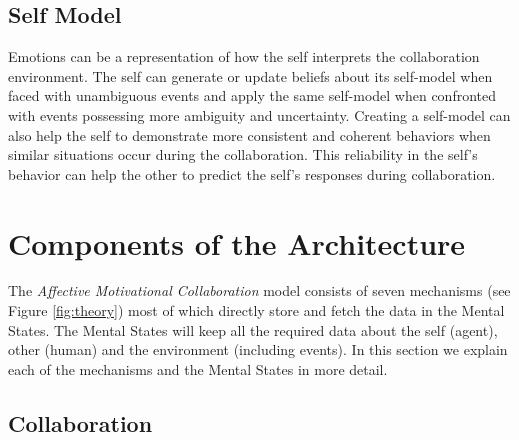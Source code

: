 \documentclass[12pt]{report}
\begin{document}
\subsection{Self Model} Emotions can be a representation of how the self
interprets the collaboration environment. The self can generate or update
beliefs about its self-model when faced with unambiguous events and apply the
same self-model when confronted with events possessing more ambiguity and
uncertainty. Creating a self-model can also help the self to demonstrate more
consistent and coherent behaviors when similar situations occur during the
collaboration. This reliability in the self's behavior can help the other to
predict the self's responses during collaboration.

\section{Components of the Architecture}
\label{sec:architecture-components}

The \textit{Affective Motivational Collaboration} model consists of seven
mechanisms (see Figure \ref{fig:theory}) most of which directly store and fetch
the data in the Mental States. The Mental States will keep all the required data
about the self (agent), other (human) and the environment (including events). In
this section we explain each of the mechanisms and the Mental States in more
detail.

\subsection{Collaboration}
\end{document}
